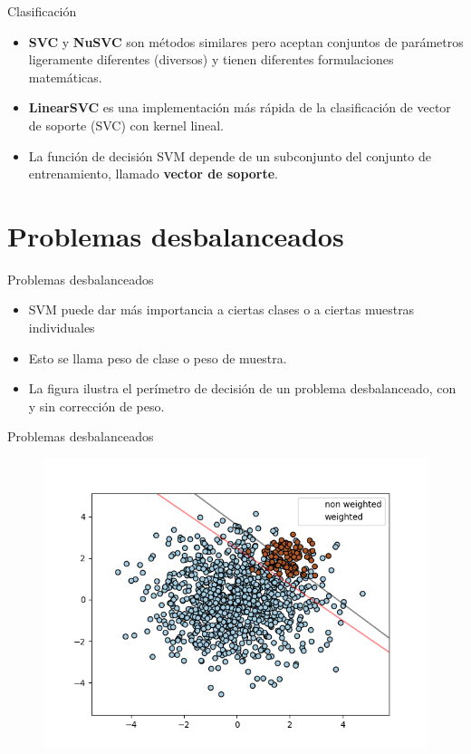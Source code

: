 \documentclass[11pt,aspectratio=169]{beamer}
\begin{document}
\begin{frame}{Clasificación}
  \begin{itemize}
    \item \textbf{SVC} y \textbf{NuSVC} son métodos similares pero aceptan conjuntos de parámetros ligeramente diferentes (diversos) y 
      tienen diferentes formulaciones matemáticas. \pause
    \item \textbf{LinearSVC} es una implementación más rápida de la clasificación de vector de soporte (SVC) con kernel lineal. \pause
    \item La función de decisión SVM depende de un subconjunto del conjunto de entrenamiento, llamado \textbf{vector de soporte}.
  \end{itemize}
\end{frame}

\section{Problemas desbalanceados}
\begin{frame}{Problemas desbalanceados}
  \begin{itemize}
    \item SVM puede dar más importancia a ciertas clases o a ciertas muestras individuales \pause
    \item Esto se llama peso de clase o peso de muestra. \pause
    \item La figura ilustra el perímetro de decisión de un problema desbalanceado, con y sin 
      corrección de peso.
  \end{itemize}
\end{frame}

\begin{frame}{Problemas desbalanceados}
  \begin{figure}
    \centering
    \includegraphics[scale=0.6]{img/701.png}
  \end{figure}
\end{frame}
\end{document}
